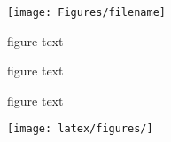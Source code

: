\begin{figure}[H]
\begin{center}\texttt{[image: Figures/filename]}
\end{center}
\caption{figure text}
\label{fig:fig1}
\end{figure}

\begin{figure}[H]
\centering
{}
\qquad
{}
\caption{figure text}
\label{fig:fig1}
\end{figure}

\begin{figure}[!htb]
\centering
{}
\qquad
{}
\qquad
{}
\qquad
{}
\caption{figure text}
\label{fig:fig1}
\end{figure}

\begin{figure}[!htb]
\begin{center}\texttt{[image: latex/figures/]}
\end{center}
\caption{}
\label{fig:fig1}
\end{figure}